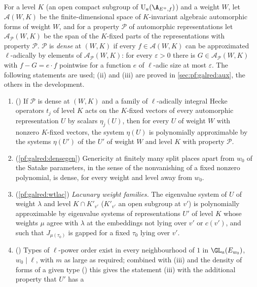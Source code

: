 For a level $K$ (an open compact subgroup of $\galredU_a(\A_{E^+,f})$) and a weight $W$, let $\mathcal A(W,K)$ be the
finite-dimensional space of $K$-invariant algebraic automorphic forms of weight $W$, and for a property $\mathcal P$ of
automorphic representations let $\mathcal A_{\mathcal P}(W,K)$ be the span of the $K$-fixed parts of the representations
with property $\mathcal P$. $\mathcal P$ is \emph{dense} at $(W,K)$ if every $f\in\mathcal A(W,K)$ can be approximated
$\ell$-adically by elements of $\mathcal A_{\mathcal P}(W,K)$: for every $\varepsilon>0$ there is
$G\in\mathcal A_{\mathcal P}(W,K)$ with $f-G=e\cdot f$ pointwise for a function $e$ of $\ell$-adic size at most
$\varepsilon$. The following statements are used; (ii) and (iii) are proved in \cref{sec:pf:galred:aux}, the others in
the development.

\begin{enumerate}[label=(\roman*),nosep]
\item () If $\mathcal P$ is dense at $(W,K)$ and a family of $\ell$-adically
  integral Hecke operators $t_j$ of level $K$ acts on the $K$-fixed vectors of every automorphic representation $U$ by
  scalars $\eta_j(U)$, then for every $U$ of weight $W$ with nonzero $K$-fixed vectors, the system $\eta(U)$ is
  polynomially approximable by the systems $\eta(U')$ of the $U'$ of weight $W$ and level $K$ with property $\mathcal P$.
\item (\cref{pf:galred:densegen}) Genericity at finitely many split places apart from $w_0$ of the Satake parameters, in
  the sense of the nonvanishing of a fixed nonzero polynomial, is dense, for every weight and level away from $w_0$.
\item (\cref{pf:galred:wtlac}) \emph{Lacunary weight families.} The eigenvalue system of $U$ of weight $\lambda$ and level
  $K\cap K'_{v'}$ ($K'_{v'}$ an open subgroup at $v'$) is polynomially approximable by eigenvalue systems of
  representations $U'$ of level $K$ whose weights $\mu$ agree with $\lambda$ at the embeddings not lying over $v'$ or
  $c(v')$, and such that $J_{\mu(\tau_0)}$ is gapped for a fixed $\tau_0$ lying over $v'$.
\item () Types of $\ell$-power order exist in every neighbourhood of $1$ in
  $\GL_a(E_{w_0})$, $w_0\mid\ell$, with $m$ as large as required; combined with (iii) and the density of forms of a given type
  () this gives the statement (iii) with the additional property that $U'$ has a

\end{enumerate}
